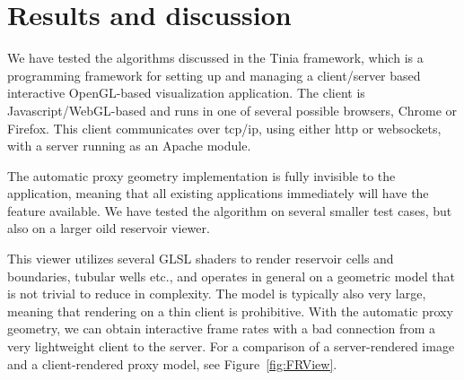 \section{Results and discussion}

We have tested the algorithms discussed in the Tinia framework, which is a
programming framework for setting up and managing a client/server based
interactive OpenGL-based visualization application. The client is
Javascript/WebGL-based and runs in one of several possible browsers, \eg Chrome
or Firefox. This client communicates over tcp/ip, using either http or
websockets, with a server running as an Apache module.

The automatic proxy geometry implementation is fully invisible to the
application, meaning that all existing applications immediately will have the
feature available. We have tested the algorithm on several smaller test cases,
but also on a larger oild reservoir viewer.

This viewer utilizes several GLSL shaders to render reservoir cells and
boundaries, tubular wells etc., and operates in general on a geometric model
that is not trivial to reduce in complexity. The model is typically also very
large, meaning that rendering on a thin client is prohibitive. With the
automatic proxy geometry, we can obtain interactive frame rates with a bad
connection from a very lightweight client to the server. For a comparison of a
server-rendered image and a client-rendered proxy model, see
Figure~\ref{fig:FRView}.

